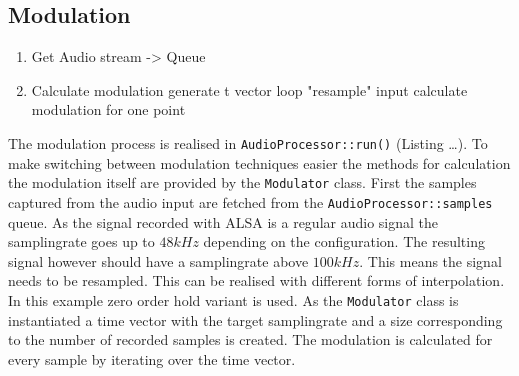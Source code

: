 \subsection{Modulation}

\begin{enumerate}
  \item Get Audio stream -> Queue
  \item Calculate modulation
  \subitem generate t vector
  \subitem loop
  \subitem "resample" input
  \subitem calculate modulation for one point
\end{enumerate}
%
The modulation process is realised in \lstinline{AudioProcessor::run()} (Listing \dots). To make switching between modulation techniques easier the methods for calculation the modulation itself are provided by the \lstinline{Modulator} class.\p
%
First the samples captured from the audio input are fetched from the \lstinline{AudioProcessor::samples} queue. As the signal recorded with ALSA is a regular audio signal the samplingrate goes up to $48kHz$ depending on the configuration. The resulting signal however should have a samplingrate above $100kHz$. This means the signal needs to be resampled. This can be realised with different forms of interpolation. In this example zero order hold variant is used.\p
As the \lstinline{Modulator} class is instantiated a time vector with the target samplingrate and a size corresponding to the number of recorded samples is created. The modulation is calculated for every sample by iterating over the time vector.